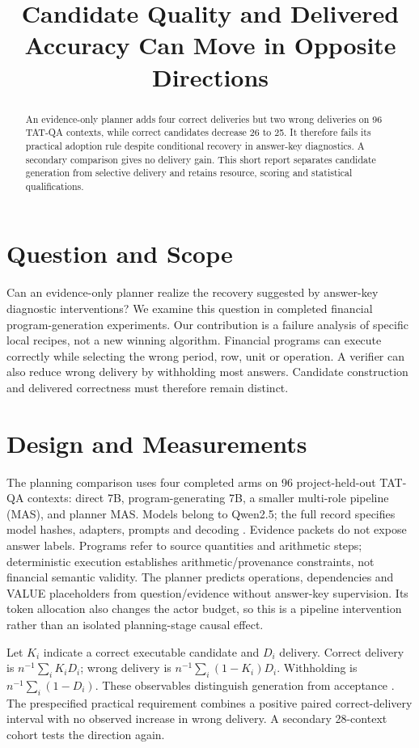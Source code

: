 \documentclass[10pt,twocolumn,letterpaper]{article}
\title{Candidate Quality and Delivered Accuracy Can Move in Opposite Directions}
\author{}\date{}
\begin{document}
\maketitle
\begin{abstract}An evidence-only planner adds four correct deliveries but two wrong deliveries on 96 TAT-QA contexts, while correct candidates decrease 26 to 25. It therefore fails its practical adoption rule despite conditional recovery in answer-key diagnostics. A secondary comparison gives no delivery gain. This short report separates candidate generation from selective delivery and retains resource, scoring and statistical qualifications.\end{abstract}

\section{Question and Scope}
Can an evidence-only planner realize the recovery suggested by answer-key diagnostic interventions? We examine this question in completed financial program-generation experiments. Our contribution is a failure analysis of specific local recipes, not a new winning algorithm. Financial programs can execute correctly while selecting the wrong period, row, unit or operation. A verifier can also reduce wrong delivery by withholding most answers. Candidate construction and delivered correctness must therefore remain distinct.

\section{Design and Measurements}
The planning comparison uses four completed arms on 96 project-held-out TAT-QA contexts: direct 7B, program-generating 7B, a smaller multi-role pipeline (MAS), and planner MAS. Models belong to Qwen2.5; the full record specifies model hashes, adapters, prompts and decoding \citep{qwen}. Evidence packets do not expose answer labels. Programs refer to source quantities and arithmetic steps; deterministic execution establishes arithmetic/provenance constraints, not financial semantic validity. The planner predicts operations, dependencies and VALUE placeholders from question/evidence without answer-key supervision. Its token allocation also changes the actor budget, so this is a pipeline intervention rather than an isolated planning-stage causal effect.

Let $K_i$ indicate a correct executable candidate and $D_i$ delivery. Correct delivery is $n^{-1}\sum_i K_iD_i$; wrong delivery is $n^{-1}\sum_i(1-K_i)D_i$. Withholding is $n^{-1}\sum_i(1-D_i)$. These observables distinguish generation from acceptance \citep{selective}. The prespecified practical requirement combines a positive paired correct-delivery interval with no observed increase in wrong delivery. A secondary 28-context cohort tests the direction again.
\end{document}
